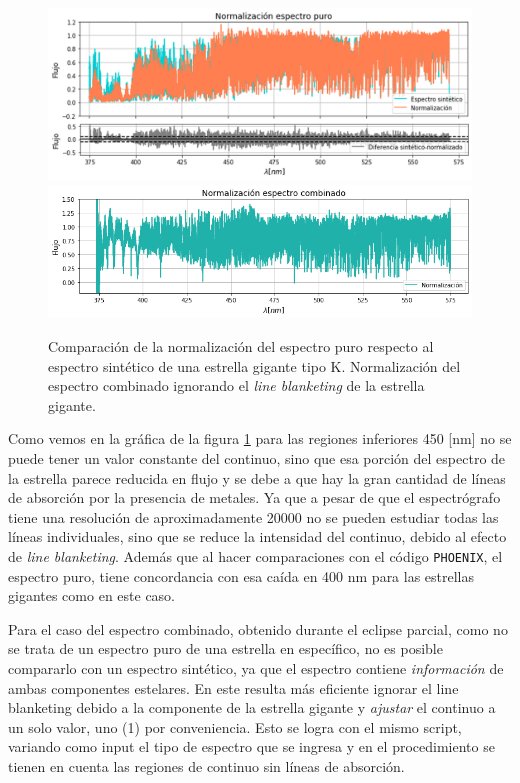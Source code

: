 \documentclass[12pt,oneside,openany,letter]{book}
\begin{document}
\begin{figure}[h]
    \centering
    \includegraphics[width=1\linewidth]{Gaficas/comparacion_normalizacion.png}
    \includegraphics[width=1\linewidth]{Gaficas/normal_comb2.png}
    \caption[Normalizaciones del espectro puro y espectro combinado del eclipse del 2019. ]{Comparación de la normalización del espectro puro respecto al espectro sintético de una estrella gigante tipo K. Normalización del espectro combinado ignorando el \textit{line blanketing} de la estrella gigante.}
    \label{fig:normalizacion}
\end{figure}

Como vemos en la gráfica de la figura \ref{fig:normalizacion} para las regiones inferiores 450 [nm] no se puede tener un valor constante del continuo, sino que esa porción del espectro de la estrella parece reducida en flujo y se debe a que hay la gran cantidad de líneas de absorción por la presencia de metales. Ya que a pesar de que el espectrógrafo tiene una resolución de aproximadamente 20000 no se pueden estudiar todas las líneas individuales, sino que se reduce la intensidad del continuo, debido al efecto de \textit{line blanketing}. Además que al hacer comparaciones con el código \texttt{PHOENIX}, el espectro puro, tiene concordancia con esa caída en 400 nm para las estrellas gigantes como en este caso.

Para el caso del espectro combinado, obtenido durante el eclipse parcial, como no se trata de un espectro puro de una estrella en específico, no es posible compararlo con un espectro sintético, ya que el espectro contiene \textit{información} de ambas componentes estelares.  En este resulta más eficiente ignorar el line blanketing debido a la componente de la estrella gigante y \textit{ajustar} el continuo a un solo valor, uno (1) por conveniencia. Esto se logra con el mismo script, variando como input el tipo de espectro que se ingresa y en el procedimiento se tienen en cuenta las regiones de continuo sin líneas de absorción.
\end{document}
